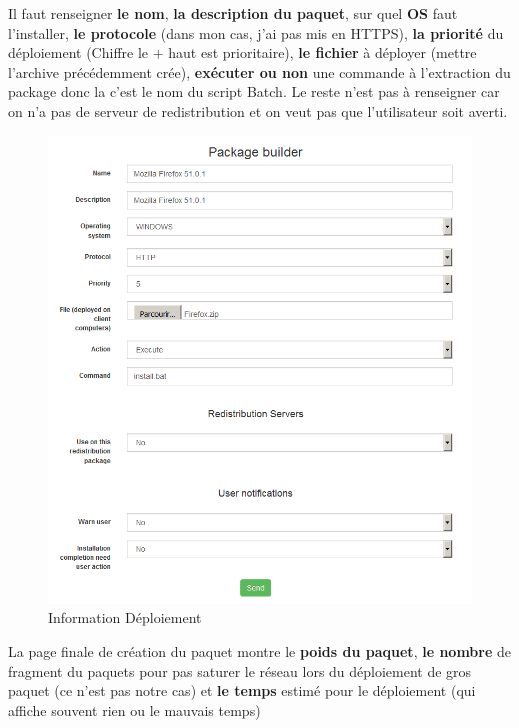 \documentclass[11pt,a4paper,oneside]{article}
\begin{document}
Il faut renseigner \textbf{le nom}, \textbf{la description du paquet}, sur quel \textbf{OS} faut l'installer, \textbf{le protocole} (dans mon cas, j'ai pas mis en HTTPS), \textbf{la priorité} du déploiement (Chiffre le + haut est prioritaire), \textbf{le fichier} à déployer (mettre l'archive précédemment crée), \textbf{exécuter ou non} une commande à l'extraction du package donc la c'est le nom du script Batch. Le reste n'est pas à renseigner car on n'a pas de serveur de redistribution et on veut pas que l'utilisateur soit averti.
\begin{figure}[hbtp]
\centering
\includegraphics[scale=0.4]{Script/Deploiement2.PNG}
\caption{Information Déploiement}
\end{figure}

La page finale de création du paquet montre le \textbf{poids du paquet}, \textbf{le nombre} de fragment du paquets pour pas saturer le réseau lors du déploiement de gros paquet (ce n'est pas notre cas) et \textbf{le temps} estimé pour le déploiement (qui affiche souvent rien ou le mauvais temps)
\end{document}
